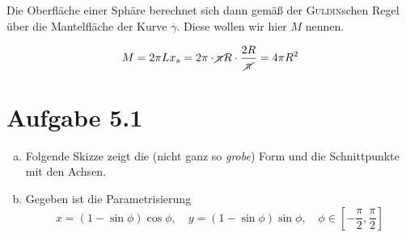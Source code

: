 \documentclass[a4paper,german,12pt,smallheadings]{scrartcl}
\begin{document}
Die Oberfläche einer Sphäre berechnet sich dann gemäß der \textsc{Guldin}schen
Regel über die Mantelfläche der Kurve $\overline{\gamma}$. Diese wollen wir
hier $M$ nennen.

\begin{equation*}
  M = 2 \pi L x_s = 2 \pi \cdot \cancel{\pi} R \cdot \frac{2R}{\cancel{\pi}} = 4 \pi R^2
\end{equation*}

\section*{Aufgabe 5.1}
\begin{enumerate}[a)]
  \item
    Folgende Skizze zeigt die (nicht ganz so \textit{grobe}) Form und die
    Schnittpunkte mit den Achsen.

    \begin{figure*}[h]
    \end{figure*}
  \item
    Gegeben ist die Parametrisierung
    \begin{equation*}
      x = (1 - \sin \phi)\cos \phi,\quad y = (1-\sin \phi)\sin \phi, \quad \phi \in [-\frac{\pi}{2},\frac{\pi}{2}]
    \end{equation*}


\end{enumerate}
\end{document}

